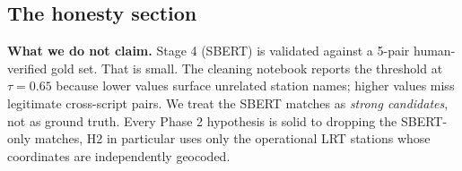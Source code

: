 \subsection{The honesty section}

\begin{warningbox}
\textbf{\color{plotorange}What we do not claim.}\quad
Stage 4 (SBERT) is validated against a 5-pair human-verified gold set.
That is small. The cleaning notebook reports the threshold at $\tau=0.65$
because lower values surface unrelated station names; higher values
miss legitimate cross-script pairs. We treat the SBERT matches as
\emph{strong candidates}, not as ground truth. Every Phase 2 hypothesis
is solid to dropping the SBERT-only matches, H2 in particular uses
only the operational LRT stations whose coordinates are independently
geocoded.
\end{warningbox}
